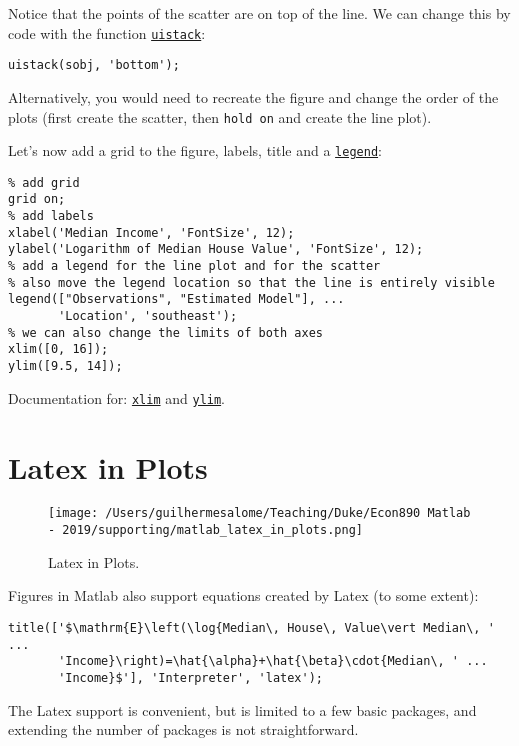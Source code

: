 \documentclass[12pt, a4paper]{article}
\begin{document}
Notice that the points of the scatter are on top of the line.
We can change this by code with the function \href{https://www.mathworks.com/help/matlab/ref/uistack.html}{\texttt{uistack}}:
\lstset{language=matlab,label= ,caption= ,captionpos=b,firstnumber=1,numbers=left,style=Matlab-editor}
\begin{lstlisting}
uistack(sobj, 'bottom');
\end{lstlisting}
Alternatively, you would need to recreate the figure and change the order of the plots (first create the scatter, then \texttt{hold on} and create the line plot).

Let's now add a grid to the figure, labels, title and a \href{https://www.mathworks.com/help/matlab/ref/legend.html}{\texttt{legend}}:
\lstset{language=matlab,label= ,caption= ,captionpos=b,firstnumber=1,numbers=left,style=Matlab-editor}
\begin{lstlisting}
% add grid
grid on;
% add labels
xlabel('Median Income', 'FontSize', 12);
ylabel('Logarithm of Median House Value', 'FontSize', 12);
% add a legend for the line plot and for the scatter
% also move the legend location so that the line is entirely visible
legend(["Observations", "Estimated Model"], ...
       'Location', 'southeast');
% we can also change the limits of both axes
xlim([0, 16]);
ylim([9.5, 14]);
\end{lstlisting}
Documentation for: \href{https://www.mathworks.com/help/matlab/ref/xlim.html}{\texttt{xlim}} and \href{https://www.mathworks.com/help/matlab/ref/ylim.html}{\texttt{ylim}}.
\section{Latex in Plots}
\label{sec:orgfed42f5}
\begin{figure}[H]
\centering
\texttt{[image: /Users/guilhermesalome/Teaching/Duke/Econ890 Matlab - 2019/supporting/matlab\_latex\_in\_plots.png]}
\caption{\label{fig:org65cd5f7}
Latex in Plots.}
\end{figure}

Figures in Matlab also support equations created by Latex (to some extent):
\lstset{language=matlab,label= ,caption= ,captionpos=b,firstnumber=1,numbers=left,style=Matlab-editor}
\begin{lstlisting}
title(['$\mathrm{E}\left(\log{Median\, House\, Value\vert Median\, ' ...
       'Income}\right)=\hat{\alpha}+\hat{\beta}\cdot{Median\, ' ...
       'Income}$'], 'Interpreter', 'latex');
\end{lstlisting}
The Latex support is convenient, but is limited to a few basic packages, and extending the number of packages is not straightforward.
\end{document}
